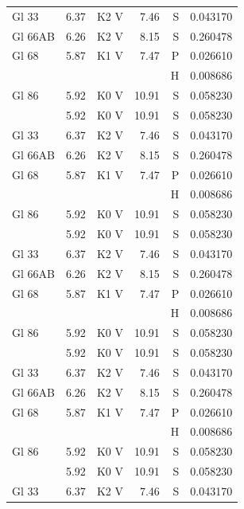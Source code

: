 \documentclass{aa}
\begin{document}
\begin{appendix}
\begin{longtable}{lllrrr}
		Gl 33     & 6.37    & K2 V     & 7.46     & S    & 0.043170   \\
		Gl 66AB   & 6.26    & K2 V     & 8.15     & S    & 0.260478   \\
		Gl 68     & 5.87    & K1 V     & 7.47     & P    & 0.026610   \\
		          &         &          &          & H    & 0.008686   \\
		Gl 86     & 5.92    & K0 V     & 10.91    & S    & 0.058230   \\            & 5.92 & K0 V & 10.91& S & 0.058230\\
		Gl 33     & 6.37    & K2 V     & 7.46     & S    & 0.043170   \\
		Gl 66AB   & 6.26    & K2 V     & 8.15     & S    & 0.260478   \\
		Gl 68     & 5.87    & K1 V     & 7.47     & P    & 0.026610   \\
		          &         &          &          & H    & 0.008686   \\
		Gl 86     & 5.92    & K0 V     & 10.91    & S    & 0.058230   \\            & 5.92 & K0 V & 10.91& S & 0.058230\\
		Gl 33     & 6.37    & K2 V     & 7.46     & S    & 0.043170   \\
		Gl 66AB   & 6.26    & K2 V     & 8.15     & S    & 0.260478   \\
		Gl 68     & 5.87    & K1 V     & 7.47     & P    & 0.026610   \\
		          &         &          &          & H    & 0.008686   \\
		Gl 86     & 5.92    & K0 V     & 10.91    & S    & 0.058230   \\            & 5.92 & K0 V & 10.91& S & 0.058230\\
		Gl 33     & 6.37    & K2 V     & 7.46     & S    & 0.043170   \\
		Gl 66AB   & 6.26    & K2 V     & 8.15     & S    & 0.260478   \\
		Gl 68     & 5.87    & K1 V     & 7.47     & P    & 0.026610   \\
		          &         &          &          & H    & 0.008686   \\
		Gl 86     & 5.92    & K0 V     & 10.91    & S    & 0.058230   \\            & 5.92 & K0 V & 10.91& S & 0.058230\\
		Gl 33     & 6.37    & K2 V     & 7.46     & S    & 0.043170   \\

\end{longtable}
\end{appendix}
\end{document}
